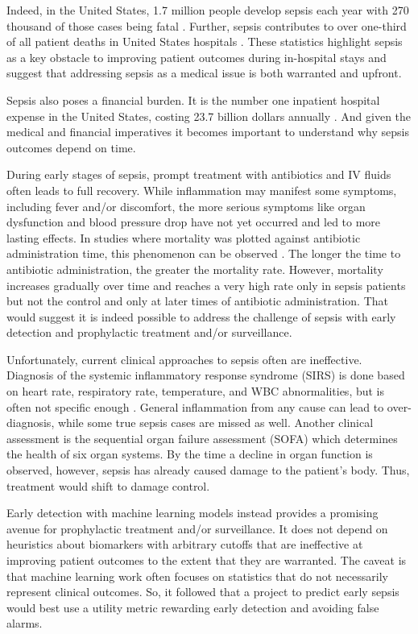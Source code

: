 \documentclass{article}
\theoremstyle{plain}
\theoremstyle{definition}
\theoremstyle{remark}
\begin{document}
Indeed, in the United States, 1.7 million people develop sepsis each year with 270 thousand of those cases being fatal \cite{hurst2020cost}. Further, sepsis contributes to over one-third of all patient deaths in United States hospitals \cite{hurst2020cost}. These statistics highlight sepsis as a key obstacle to improving patient outcomes during in-hospital stays and suggest that addressing sepsis as a medical issue is both warranted and upfront.

Sepsis also poses a financial burden. It is the number one inpatient hospital expense in the United States, costing 23.7 billion dollars annually \cite{hurst2020cost}. And given the medical and financial imperatives it becomes important to understand why sepsis outcomes depend on time.

During early stages of sepsis, prompt treatment with antibiotics and IV fluids often leads to full recovery. While inflammation may manifest some symptoms, including fever and/or discomfort, the more serious symptoms like organ dysfunction and blood pressure drop have not yet occurred and led to more lasting effects. In studies where mortality was plotted against antibiotic administration time, this phenomenon can be observed \cite{im2022timetoantibiotics}. The longer the time to antibiotic administration, the greater the mortality rate. However, mortality increases gradually over time and reaches a very high rate only in sepsis patients but not the control and only at later times of antibiotic administration. That would suggest it is indeed possible to address the challenge of sepsis with early detection and prophylactic treatment and/or surveillance.

Unfortunately, current clinical approaches to sepsis often are ineffective. Diagnosis of the systemic inflammatory response syndrome (SIRS) is done based on heart rate, respiratory rate, temperature, and WBC abnormalities, but is often not specific enough \cite{kaukonen2015sirs, singer2016sepsis3, beesley2015neednewdef}. General inflammation from any cause can lead to over-diagnosis, while some true sepsis cases are missed as well. Another clinical assessment is the sequential organ failure assessment (SOFA) which determines the health of six organ systems. By the time a decline in organ function is observed, however, sepsis has already caused damage to the patient’s body. Thus, treatment would shift to damage control.

Early detection with machine learning models instead provides a promising avenue for prophylactic treatment and/or surveillance. It does not depend on heuristics about biomarkers with arbitrary cutoffs that are ineffective at improving patient outcomes to the extent that they are warranted. The caveat is that machine learning work often focuses on statistics that do not necessarily represent clinical outcomes. So, it followed that a project to predict early sepsis would best use a utility metric rewarding early detection and avoiding false alarms.
\end{document}
